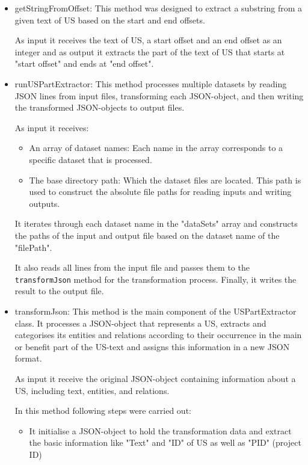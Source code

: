\begin{itemize}
	
	\item getStringFromOffset: This method was designed to extract a substring from a given text of US based on the start and end offsets.
	
	As input it receives the text of US, a start offset and an end offset as an integer and as output it extracts the part of the text of US that starts at "start offset" and ends at "end offset".
	
	\item runUSPartExtractor: This method processes multiple datasets by reading JSON lines from input files, transforming each JSON-object, and then writing the transformed JSON-objects to output files.
	
	As input it receives:
	\begin{itemize}
		\item An array of dataset names: Each name in the array corresponds to a specific dataset that is processed.
		
		\item The base directory path: Which the dataset files are located. This path is used to construct the absolute file paths for reading inputs and writing outputs.
	\end{itemize}	
	It iterates through each dataset name in the "dataSets" array and constructs the paths of the input and output file based on the dataset name of the "filePath".
	
	It also reads all lines from the input file and passes them to the \texttt{transformJson} method for the transformation process. Finally, it writes the result to the output file.
	
	\item transformJson: This method is the main component of the USPartExtractor class. It processes a JSON-object that represents a US, extracts and categorises its entities and relations according to their occurrence in the main or benefit part of the US-text and assigns this information in a new JSON format.
	
	As input it receive the original JSON-object containing information about a US, including text, entities, and relations.
	
	In this method following steps were carried out:
	\begin{itemize}
		\item It initialise a JSON-object to hold the transformation data and extract the basic information like "Text" and "ID" of US as well as "PID" (project ID)
		

\end{itemize}
\end{itemize}
